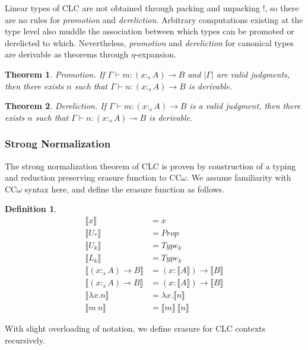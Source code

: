 \documentclass[sigplan,screen]{acmart}
\newtheorem{theorem}{Theorem}[section]
\theoremstyle{definition}
\newtheorem{definition}{Definition}[section]
\newcommand{\pure}[1]{|#1|}
\newcommand{\stype}[1]{:_#1}
\newcommand{\erase}[1]{\llbracket #1 \rrbracket}
\begin{document}
  Linear types of CLC are not obtained through packing and unpacking !, so there are no rules for \textit{promotion} and \textit{dereliction}. Arbitrary computations existing at the type level also muddle the association between which types can be promoted or derelicted to which. Nevertheless, \textit{promotion} and \textit{dereliction} for canonical types are derivable as theorems through $\eta$-expansion.

  \begin{theorem} 
    Promotion. If $\Gamma \vdash m : (x \stype{s} A) \multimap B$ and $\pure{\Gamma}$ are valid judgments, then there exists $n$ such that $\Gamma \vdash n : (x \stype{s} A) \rightarrow B$ is derivable.
  \end{theorem}

  \begin{theorem} 
    Dereliction. If $\Gamma \vdash m : (x \stype{s} A) \rightarrow B$ is a valid judgment, then there exists $n$ such that $\Gamma \vdash n : (x \stype{s} A) \multimap B$ is derivable.
  \end{theorem}

  \subsubsection{Strong Normalization}
  The strong normalization theorem of CLC is proven by construction of a typing and reduction preserving erasure function to CC$\omega$. We assume familiarity with CC$\omega$ syntax here, and define the erasure function as follows.

  \begin{definition}
    \begin{align*}
      \erase{x} &= x \\
      \erase{U_*} &= Prop \\
      \erase{U_k} &= Type_k \\
      \erase{L_k} &= Type_k \\
      \erase{(x \stype{s} A) \rightarrow B} &= (x : \erase{A}) \rightarrow \erase{B} \\
      \erase{(x \stype{s} A) \multimap B} &= (x : \erase{A}) \rightarrow \erase{B} \\
      \erase{\lambda x.n} &= \lambda x.\erase{n} \\
      \erase{m\ n} &= \erase{m}\ \erase{n}
    \end{align*}
  \end{definition}

  With slight overloading of notation, we define erasure for CLC contexts recursively.
\end{document}
